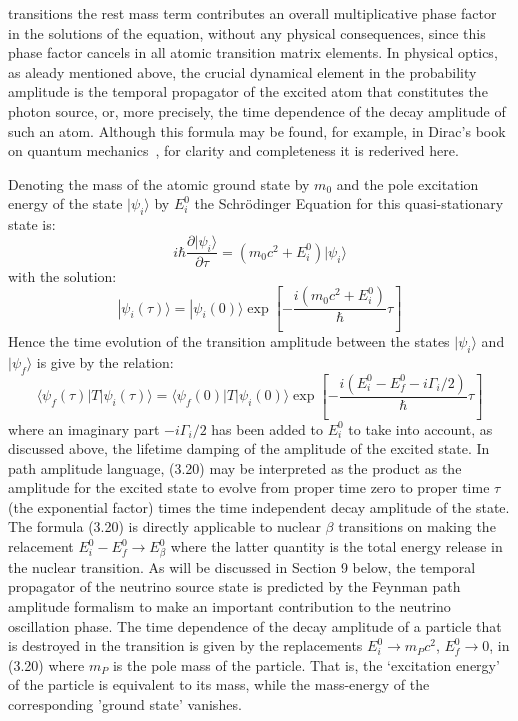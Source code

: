 {  transitions the rest mass term contributes an overall multiplicative phase factor
  in the solutions of the equation, without any physical consequences, since this phase 
  factor cancels in all atomic transition matrix elements. In physical optics, as aleady 
  mentioned above, the crucial dynamical element in the probability amplitude
  is the temporal propagator of the excited atom that constitutes the photon source,
  or, more precisely, the time dependence of the decay amplitude of such an atom.
  Although this formula may be found, for example, in Dirac's book
  on quantum mechanics~\cite{Diracprop}, for clarity and completeness it 
  is rederived here. 
   \par Denoting the mass of the atomic ground state by $m_0$ and the pole excitation
  energy of the state $|\psi_i\rangle$ by $E^{0}_i$
  the  Schr\"{o}dinger Equation for this quasi-stationary state is:
  \begin{equation}
  i\hbar \frac{\partial |\psi_i\rangle}{\partial \tau} = (m_0 c^2+ E^{0}_i)|\psi_i\rangle
  \end{equation}
  with the solution:
 \begin{equation}
|\psi_i(\tau)\rangle = |\psi_i(0)\rangle\exp\left[-\frac{i( m_0 c^2 + E^{0}_i)}{\hbar} \tau \right] 
  \end{equation}
 Hence the time evolution of the transition amplitude between the states  $|\psi_i\rangle$ and
 $|\psi_f\rangle$ is give by the relation:
 \begin{equation}
 \langle \psi_f(\tau)|T|\psi_i(\tau)\rangle = \langle \psi_f(0)|T|\psi_i(0)\rangle 
   \exp\left[-\frac{i(E^{0}_i- E^{0}_f-i\Gamma_i/2)}{\hbar} \tau \right] 
   \end{equation}
  where an imaginary part $-i\Gamma_i/2$ has been added to $E^{0}_i$ to take into account, as discussed
  above, the lifetime damping of the amplitude of the excited state. In path amplitude 
  language, (3.20) may be interpreted as the product as the amplitude for the excited state to evolve 
  from proper time zero to proper time $\tau$ (the exponential factor) times the time independent
  decay amplitude of the state.  The formula (3.20) is directly applicable to nuclear $\beta$ transitions
   on making the relacement $E^{0}_i- E^{0}_f \rightarrow E^{0}_{\beta}$ where the latter
   quantity is the total energy release in the nuclear transition. As will be discussed in 
    Section 9 below, the temporal  propagator of the neutrino source state is predicted
    by the Feynman path amplitude formalism to make an important contribution to the
    neutrino oscillation phase. The time dependence of the decay amplitude of a particle
  that is destroyed in the transition is given by the replacements $E^{0}_i \rightarrow m_P c^2$,
   $E^{0}_f \rightarrow 0$, in (3.20) where $m_ P$ is the pole mass of the particle.
   That is, the `excitation energy' of the particle is equivalent to its mass, while the mass-energy 
   of the corresponding 'ground state' vanishes.

}
